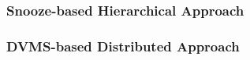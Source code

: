 \subsubsection{Snooze-based Hierarchical Approach}
\label{subsec:snooze}


\subsubsection{DVMS-based Distributed Approach}
\label{subsec:dvms}



